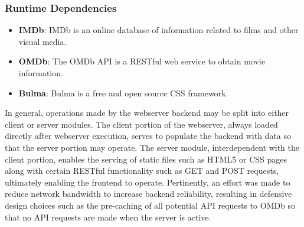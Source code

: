 \documentclass{article}
\begin{document}
\subsubsection*{Runtime Dependencies}
\begin{itemize}
\item \textbf{IMDb}: IMDb is an online database of information related to films
and other visual media.
\item \textbf{OMDb}: The OMDb API is a RESTful web service to obtain movie
information.
\item \textbf{Bulma}: Bulma is a free and open source CSS framework.
\end{itemize}
In general, operations made by the webserver backend may be split into either 
client or server modules. The client portion of the webserver, always loaded
directly after webserver execution, serves to populate the backend with data
so that the server portion may operate. The server module, interdependent with
the client portion, enables the serving of static files such as HTML5 or CSS
pages along with certain RESTful functionality such as GET and POST requests,
ultimately enabling the frontend to operate. Pertinently, an effort was made to
reduce network bandwidth to increase backend reliability, resulting in defensive
design choices such as the pre-caching of all potential API requests to OMDb so
that no API requests are made when the server is active.
\end{document}
